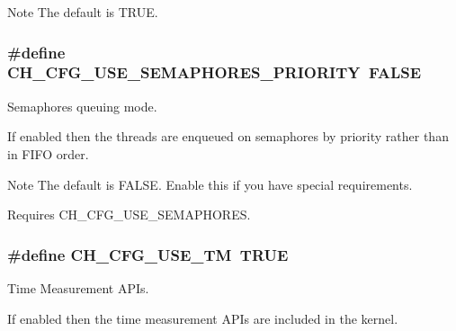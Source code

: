 \begin{DoxyNote}{Note}
The default is {\ttfamily T\+R\+U\+E}. 
\end{DoxyNote}
\hypertarget{group__config_ga04e4e037498950df8bdef88bdd199494}{
\subsubsection[{C\+H\+\_\+\+C\+F\+G\+\_\+\+U\+S\+E\+\_\+\+S\+E\+M\+A\+P\+H\+O\+R\+E\+S\+\_\+\+P\+R\+I\+O\+R\+I\+T\+Y}]{\setlength{\rightskip}{0pt plus 5cm}\#define C\+H\+\_\+\+C\+F\+G\+\_\+\+U\+S\+E\+\_\+\+S\+E\+M\+A\+P\+H\+O\+R\+E\+S\+\_\+\+P\+R\+I\+O\+R\+I\+T\+Y~F\+A\+L\+S\+E}}\label{group__config_ga04e4e037498950df8bdef88bdd199494}


Semaphores queuing mode. 

If enabled then the threads are enqueued on semaphores by priority rather than in F\+I\+F\+O order.

\begin{DoxyNote}{Note}
The default is {\ttfamily F\+A\+L\+S\+E}. Enable this if you have special requirements. 

Requires {\ttfamily C\+H\+\_\+\+C\+F\+G\+\_\+\+U\+S\+E\+\_\+\+S\+E\+M\+A\+P\+H\+O\+R\+E\+S}. 
\end{DoxyNote}
\hypertarget{group__config_ga1bd0fe5d119a7de890025214ae249c1d}{
\subsubsection[{C\+H\+\_\+\+C\+F\+G\+\_\+\+U\+S\+E\+\_\+\+T\+M}]{\setlength{\rightskip}{0pt plus 5cm}\#define C\+H\+\_\+\+C\+F\+G\+\_\+\+U\+S\+E\+\_\+\+T\+M~T\+R\+U\+E}}\label{group__config_ga1bd0fe5d119a7de890025214ae249c1d}


Time Measurement A\+P\+Is. 

If enabled then the time measurement A\+P\+Is are included in the kernel.

